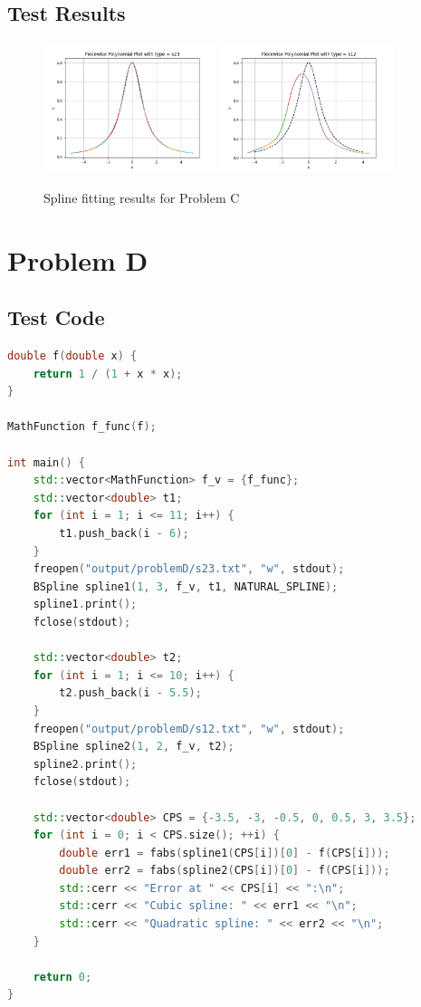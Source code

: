 \documentclass[a4paper]{article}
\begin{document}
\subsection{Test Results}
\begin{figure}[H]
    \centering
    \includegraphics[width=0.45\textwidth]{./figure/problemC/s23.png}
    \includegraphics[width=0.45\textwidth]{./figure/problemC/s12.png}
    \caption{Spline fitting results for Problem C}
\end{figure}

\section{Problem D}

\subsection{Test Code}

\begin{lstlisting}[language=C++]
double f(double x) {
    return 1 / (1 + x * x);
}

MathFunction f_func(f);

int main() {
    std::vector<MathFunction> f_v = {f_func};
    std::vector<double> t1;
    for (int i = 1; i <= 11; i++) {
        t1.push_back(i - 6);
    }
    freopen("output/problemD/s23.txt", "w", stdout);
    BSpline spline1(1, 3, f_v, t1, NATURAL_SPLINE);
    spline1.print();
    fclose(stdout);

    std::vector<double> t2;
    for (int i = 1; i <= 10; i++) {
        t2.push_back(i - 5.5);
    }
    freopen("output/problemD/s12.txt", "w", stdout);
    BSpline spline2(1, 2, f_v, t2);
    spline2.print();
    fclose(stdout);

    std::vector<double> CPS = {-3.5, -3, -0.5, 0, 0.5, 3, 3.5};
    for (int i = 0; i < CPS.size(); ++i) {
        double err1 = fabs(spline1(CPS[i])[0] - f(CPS[i]));
        double err2 = fabs(spline2(CPS[i])[0] - f(CPS[i]));
        std::cerr << "Error at " << CPS[i] << ":\n";
        std::cerr << "Cubic spline: " << err1 << "\n";
        std::cerr << "Quadratic spline: " << err2 << "\n";
    }

    return 0;
}
\end{lstlisting}
\end{document}
